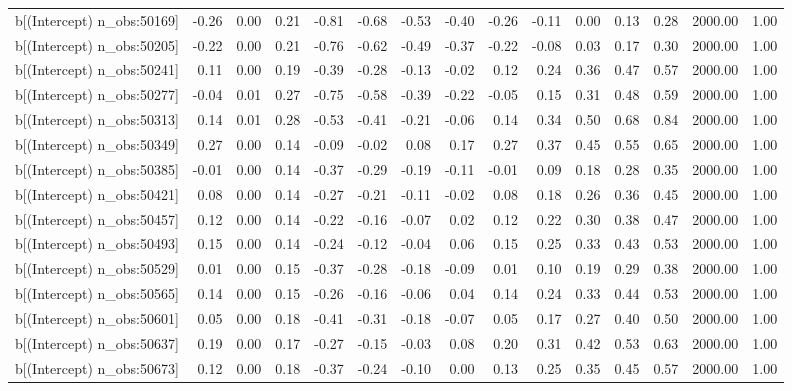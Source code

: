 \begin{table}[ht]
\begin{tabular}{rrrrrrrrrrrrrrr}
  b[(Intercept) n\_obs:50169] & -0.26 & 0.00 & 0.21 & -0.81 & -0.68 & -0.53 & -0.40 & -0.26 & -0.11 & 0.00 & 0.13 & 0.28 & 2000.00 & 1.00 \\ 
  b[(Intercept) n\_obs:50205] & -0.22 & 0.00 & 0.21 & -0.76 & -0.62 & -0.49 & -0.37 & -0.22 & -0.08 & 0.03 & 0.17 & 0.30 & 2000.00 & 1.00 \\ 
  b[(Intercept) n\_obs:50241] & 0.11 & 0.00 & 0.19 & -0.39 & -0.28 & -0.13 & -0.02 & 0.12 & 0.24 & 0.36 & 0.47 & 0.57 & 2000.00 & 1.00 \\ 
  b[(Intercept) n\_obs:50277] & -0.04 & 0.01 & 0.27 & -0.75 & -0.58 & -0.39 & -0.22 & -0.05 & 0.15 & 0.31 & 0.48 & 0.59 & 2000.00 & 1.00 \\ 
  b[(Intercept) n\_obs:50313] & 0.14 & 0.01 & 0.28 & -0.53 & -0.41 & -0.21 & -0.06 & 0.14 & 0.34 & 0.50 & 0.68 & 0.84 & 2000.00 & 1.00 \\ 
  b[(Intercept) n\_obs:50349] & 0.27 & 0.00 & 0.14 & -0.09 & -0.02 & 0.08 & 0.17 & 0.27 & 0.37 & 0.45 & 0.55 & 0.65 & 2000.00 & 1.00 \\ 
  b[(Intercept) n\_obs:50385] & -0.01 & 0.00 & 0.14 & -0.37 & -0.29 & -0.19 & -0.11 & -0.01 & 0.09 & 0.18 & 0.28 & 0.35 & 2000.00 & 1.00 \\ 
  b[(Intercept) n\_obs:50421] & 0.08 & 0.00 & 0.14 & -0.27 & -0.21 & -0.11 & -0.02 & 0.08 & 0.18 & 0.26 & 0.36 & 0.45 & 2000.00 & 1.00 \\ 
  b[(Intercept) n\_obs:50457] & 0.12 & 0.00 & 0.14 & -0.22 & -0.16 & -0.07 & 0.02 & 0.12 & 0.22 & 0.30 & 0.38 & 0.47 & 2000.00 & 1.00 \\ 
  b[(Intercept) n\_obs:50493] & 0.15 & 0.00 & 0.14 & -0.24 & -0.12 & -0.04 & 0.06 & 0.15 & 0.25 & 0.33 & 0.43 & 0.53 & 2000.00 & 1.00 \\ 
  b[(Intercept) n\_obs:50529] & 0.01 & 0.00 & 0.15 & -0.37 & -0.28 & -0.18 & -0.09 & 0.01 & 0.10 & 0.19 & 0.29 & 0.38 & 2000.00 & 1.00 \\ 
  b[(Intercept) n\_obs:50565] & 0.14 & 0.00 & 0.15 & -0.26 & -0.16 & -0.06 & 0.04 & 0.14 & 0.24 & 0.33 & 0.44 & 0.53 & 2000.00 & 1.00 \\ 
  b[(Intercept) n\_obs:50601] & 0.05 & 0.00 & 0.18 & -0.41 & -0.31 & -0.18 & -0.07 & 0.05 & 0.17 & 0.27 & 0.40 & 0.50 & 2000.00 & 1.00 \\ 
  b[(Intercept) n\_obs:50637] & 0.19 & 0.00 & 0.17 & -0.27 & -0.15 & -0.03 & 0.08 & 0.20 & 0.31 & 0.42 & 0.53 & 0.63 & 2000.00 & 1.00 \\ 
  b[(Intercept) n\_obs:50673] & 0.12 & 0.00 & 0.18 & -0.37 & -0.24 & -0.10 & 0.00 & 0.13 & 0.25 & 0.35 & 0.45 & 0.57 & 2000.00 & 1.00 \\ 

\end{tabular}
\end{table}
